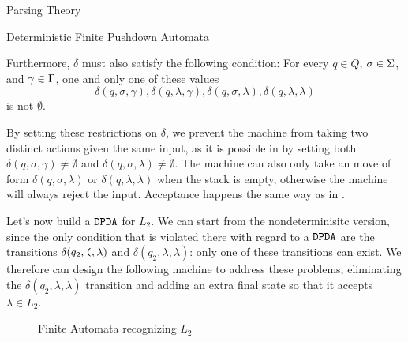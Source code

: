 \begin{section}{Parsing Theory}
\begin{subsection}{Deterministic Finite Pushdown Automata}
\begin{definition}
Furthermore, $\delta$ must also satisfy the following condition: For every $q \in Q$, $\sigma \in \Sigma$,
and $\gamma \in \Gamma$, one and only one of these values
$$\delta(q, \sigma, \gamma), \delta(q, \lambda, \gamma), \delta(q, \sigma, \lambda), \delta(q, \lambda, \lambda)$$
is not $\emptyset$.

\end{definition}

By setting these restrictions on $\delta$, we prevent the machine from taking two
distinct actions given the same input, as it is possible in 
by setting both $\delta(q, \sigma, \gamma) \neq \emptyset$ and
$\delta(q, \sigma, \lambda) \neq \emptyset$. The machine can also only take an
move of form $\delta(q, \sigma, \lambda)$ or $\delta(q, \lambda, \lambda)$ when
the stack is empty, otherwise the machine will always reject the input. Acceptance
happens the same way as in .

Let's now build a $\texttt{DPDA}$ for $L_2$. We can start
from the nondeterminisitc version, since the only condition that is violated
there with regard to a $\texttt{DPDA}$ are the transitions
$\delta(q_2, \texttt{(}, \lambda)$ and $\delta(q_2, \lambda, \lambda)$: only one
of these transitions can exist. We therefore can design the following machine
to address these problems, eliminating the $\delta(q_2, \lambda, \lambda)$
transition and adding an extra final state so that it accepts $\lambda \in L_2$.

\begin{figure}

\caption{Finite Automata recognizing $L_2$}
\label{fig:pushdown_automata}
\end{figure}


\end{subsection}
\end{section}
